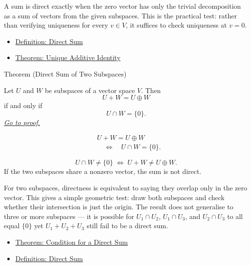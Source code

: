 \begin{remark*}[Interpretation]
A sum is direct exactly when the zero vector has only the trivial
decomposition as a sum of vectors from the given subspaces. This is the
practical test: rather than verifying uniqueness for every $v \in V$,
it suffices to check uniqueness at $v = 0$.
\end{remark*}

\begin{dependencies}
\begin{itemize}
  \item \hyperref[def:direct-sum]{Definition: Direct Sum}
  \item \hyperref[thm:unique-additive-identity]{Theorem: Unique Additive Identity}
\end{itemize}
\end{dependencies}


\begin{theorembox}{Theorem (Direct Sum of Two Subspaces)}
\begin{theorem}
\label{thm:direct-sum-of-two-subspaces}
Let $U$ and $W$ be subspaces of a vector space $V$.
Then
\[
U+W=U\oplus W
\]
if and only if
\[
U \cap W = \{0\}.
\]
\hyperref[prf:direct-sum-of-two-subspaces]{\textit{Go to proof.}}
\end{theorem}
\end{theorembox}

\begin{remark*}
\[
\begin{aligned}
&U+W=U\oplus W \\
&\quad\Longleftrightarrow\quad
U \cap W = \{0\}.
\end{aligned}
\]
\end{remark*}

\begin{remark*}
\[
U \cap W \neq \{0\}
\;\Longleftrightarrow\;
U + W \neq U \oplus W.
\]
If the two subspaces share a nonzero vector, the sum is not direct.
\end{remark*}

\begin{remark*}[Interpretation]
For two subspaces, directness is equivalent to saying they overlap only
in the zero vector. This gives a simple geometric test: draw both subspaces
and check whether their intersection is just the origin. The result does not
generalise to three or more subspaces --- it is possible for $U_1\cap U_2$,
$U_1\cap U_3$, and $U_2\cap U_3$ to all equal $\{0\}$ yet $U_1+U_2+U_3$
still fail to be a direct sum.
\end{remark*}

\begin{dependencies}
\begin{itemize}
  \item \hyperref[thm:condition-for-direct-sum]{Theorem: Condition for a Direct Sum}
  \item \hyperref[def:direct-sum]{Definition: Direct Sum}
\end{itemize}
\end{dependencies}
